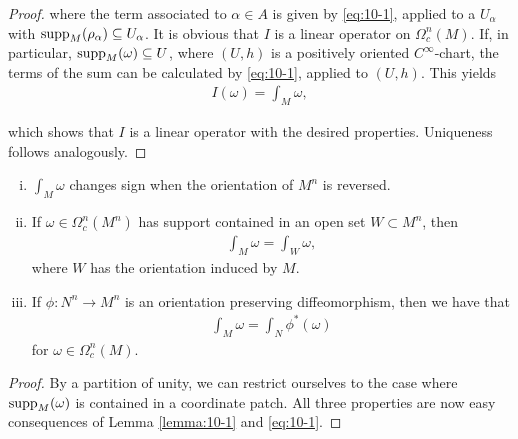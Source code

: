 \begin{proof}
where the term associated to $\alpha\in A$ is given by \eqref{eq:10-1}, applied to a $U_\alpha$ with
$\operatorname{supp}_M(\rho_\alpha)\subseteq U_\alpha$. It is obvious that $I$ is a linear operator on $\Omega^n_c(M)$. If, in
particular, $\operatorname{supp}_M(\omega)\subseteq U$, where $(U, h)$ is a positively oriented $C^\infty$-chart, the
terms of the sum can be calculated by \eqref{eq:10-1}, applied to $(U, h)$. This yields
\begin{align*}
  I(\omega) = \int_M \omega,
\end{align*}

which shows that $I$ is a linear operator with the desired properties. Uniqueness
follows analogously.
\end{proof}

\begin{lemma}\label{lemma:10-3} 
  \begin{enumerate}[(i)]
    \item $\int_M\omega$ changes sign when the orientation of $M^n$ is reversed.
    \item If $\omega\in\Omega^n_c(M^n)$ has support contained in an open set $W\subset M^n$, then 
      \begin{align*}
        \int_M\omega = \int_W\omega,
      \end{align*}
      where $W$ has the orientation induced by $M$.
    \item If $\phi:N^n\to M^n$ is an orientation preserving diffeomorphism, then we have that 
      \begin{align*}
        \int_M\omega = 
        \int_N\phi^*(\omega)
      \end{align*}
      for $\omega\in\Omega^n_c(M)$.
  \end{enumerate}
\end{lemma}

\begin{proof}
  By a partition of unity, we can restrict ourselves to the case where
$\operatorname{supp}_M(\omega)$ is contained in a coordinate patch. All three properties are now easy
consequences of Lemma \ref{lemma:10-1} and \eqref{eq:10-1}.
\end{proof}

